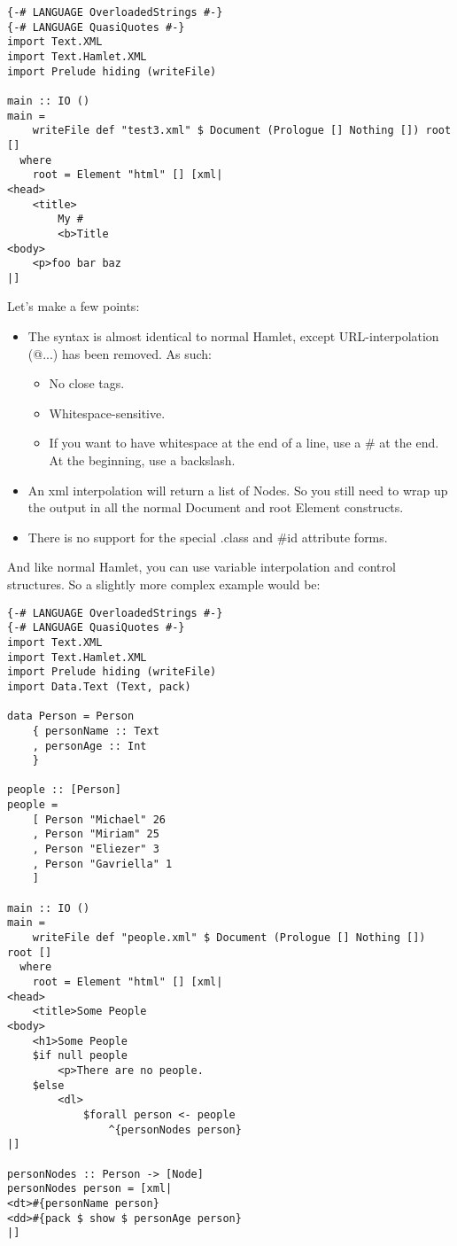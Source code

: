 \begin{lstlisting}
{-# LANGUAGE OverloadedStrings #-}
{-# LANGUAGE QuasiQuotes #-}
import Text.XML
import Text.Hamlet.XML
import Prelude hiding (writeFile)

main :: IO ()
main =
    writeFile def "test3.xml" $ Document (Prologue [] Nothing []) root []
  where
    root = Element "html" [] [xml|
<head>
    <title>
        My #
        <b>Title
<body>
    <p>foo bar baz
|]
\end{lstlisting}%

Let's make a few points:

\begin{itemize}
\item The syntax is almost identical to normal Hamlet, except URL-interpolation (@{...}) has been removed. As such:

\begin{itemize}
\item No close tags.
\item Whitespace-sensitive.
\item If you want to have whitespace at the end of a line, use a \# at the end. At the beginning, use a backslash.
\end{itemize}
  
\item An xml interpolation will return a list of Nodes. So you still need to wrap up the output in all the normal Document and root Element constructs.
\item There is no support for the special .class and \#id attribute forms.
\end{itemize}

And like normal Hamlet, you can use variable interpolation and control structures. So a slightly more complex example would be:

\begin{lstlisting}
{-# LANGUAGE OverloadedStrings #-}
{-# LANGUAGE QuasiQuotes #-}
import Text.XML
import Text.Hamlet.XML
import Prelude hiding (writeFile)
import Data.Text (Text, pack)

data Person = Person
    { personName :: Text
    , personAge :: Int
    }

people :: [Person]
people =
    [ Person "Michael" 26
    , Person "Miriam" 25
    , Person "Eliezer" 3
    , Person "Gavriella" 1
    ]

main :: IO ()
main =
    writeFile def "people.xml" $ Document (Prologue [] Nothing []) root []
  where
    root = Element "html" [] [xml|
<head>
    <title>Some People
<body>
    <h1>Some People
    $if null people
        <p>There are no people.
    $else
        <dl>
            $forall person <- people
                ^{personNodes person}
|]

personNodes :: Person -> [Node]
personNodes person = [xml|
<dt>#{personName person}
<dd>#{pack $ show $ personAge person}
|]
\end{lstlisting}%

